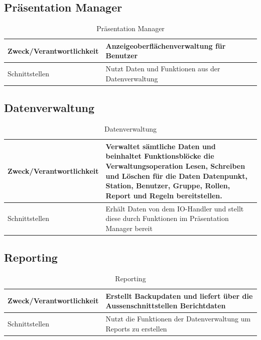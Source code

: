 \subsection{Präsentation Manager}
\begin{table}[th]
	\begin{tabularx}{\textwidth}{X X}
		\hline
		Zweck/Verantwortlichkeit & Anzeigeoberflächenverwaltung für Benutzer \\
		\hline
		Schnittstellen & Nutzt Daten und Funktionen aus der Datenverwaltung\\
		\hline
	\end{tabularx} 
	\caption{Präsentation Manager}
	\label{tab:Präsentation Manager}
\end{table}

\subsection{Datenverwaltung}
\begin{table}[th]
	\begin{tabularx}{\textwidth}{X X}
		\hline
		Zweck/Verantwortlichkeit & Verwaltet sämtliche Daten und beinhaltet Funktionsblöcke die Verwaltungsoperation Lesen, Schreiben und Löschen für die Daten Datenpunkt, Station, Benutzer, Gruppe, Rollen, Report und Regeln bereitstellen. \\
		\hline
		Schnittstellen & Erhält Daten von dem IO-Handler und stellt diese durch Funktionen im Präsentation Manager bereit\\
		\hline
	\end{tabularx} 
	\caption{Datenverwaltung}
	\label{Datenverwaltung}
\end{table}
\clearpage
\subsection{Reporting}
\begin{table}[th]
	\begin{tabularx}{\textwidth}{p{5cm} X}
		\hline
		Zweck/Verantwortlichkeit & Erstellt Backupdaten und liefert über die Aussenschnittstellen Berichtdaten \\
		\hline
		Schnittstellen & Nutzt die Funktionen der Datenverwaltung um Reports zu erstellen\\
		\hline
	\end{tabularx} 
	\caption{Reporting}
	\label{tab:Reporting}
\end{table}

